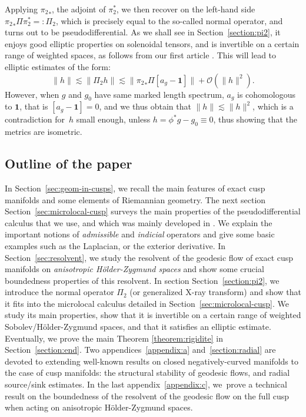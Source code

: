 \documentclass[10pt]{amsart}
\newcommand{\mc}{\mathcal}
\theoremstyle{plain}
\theoremstyle{definition}
\begin{document}
Applying ${\pi_2}_*$, the adjoint of $\pi_2^*$, we then recover on the left-hand side ${\pi_2}_* \Pi \pi_2^* =: \Pi_2$, which is precisely equal to the so-called normal operator, and turns out to be pseudodifferential. As we shall see in Section~\ref{section:pi2}, it enjoys good elliptic properties on solenoidal tensors, and is invertible on a certain range of weighted spaces, as follows from our first article \cite{Bonthonneau-Lefeuvre-19-1}. This will lead to elliptic estimates of the form:
\[
\|h\| \lesssim \|\Pi_2 h\| \lesssim \|{\pi_2}_* \Pi[a_g-\mathbf{1}]\| + \mc{O}(\|h\|^2).
\]
However, when $g$ and $g_0$ have same marked length spectrum, $a_g$ is cohomologous to $\mathbf{1}$, that is $[a_g-\mathbf{1}] = 0$, and we thus obtain that $\|h\| \lesssim \|h\|^2$, which is a contradiction for~$h$ small enough, unless $h = \phi^*g-g_0 \equiv 0$, thus showing that the metrics are isometric.

\subsection{Outline of the paper} In Section~\ref{sec:geom-in-cusps}, we recall the main features of exact cusp manifolds and some elements of Riemannian geometry. The next section Section~\ref{sec:microlocal-cusp} surveys the main properties of the pseudodifferential calculus that we use, and which was mainly developed in \cite{Bonthonneau-16,Bonthonneau-Weich-17,Bonthonneau-Lefeuvre-19-1}. We explain the important notions of \emph{admissible} and \emph{indicial} operators and give some basic examples such as the Laplacian, or the exterior derivative. In Section~\ref{sec:resolvent}, we study the resolvent of the geo\-desic flow of exact cusp manifolds on \emph{anisotropic Hölder-Zygmund spaces} and show some crucial boundedness properties of this resolvent. In section Section~\ref{section:pi2}, we introduce the normal operator $\Pi_2$ (or generalized X-ray transform) and show that it fits into the microlocal calculus detailed in Section~\ref{sec:microlocal-cusp}. We study its main properties, show that it is invertible on a certain range of weighted Sobolev/Hölder-Zygmund spaces, and that it satisfies an elliptic estimate. Eventually, we prove the main Theorem \ref{theorem:rigidite} in Section~\ref{section:end}. Two appendices~\ref{appendix:a} and~\ref{section:radial} are devoted to extending well-known results on closed negatively-curved manifolds to the case of cusp manifolds: the structural stability of geodesic flows, and radial source/sink estimates. In the last appendix~\ref{appendix:c}, we~prove a technical result on the boundedness of the resolvent of the geodesic flow on the full cusp when acting on anisotropic Hölder-Zygmund spaces.
\end{document}
